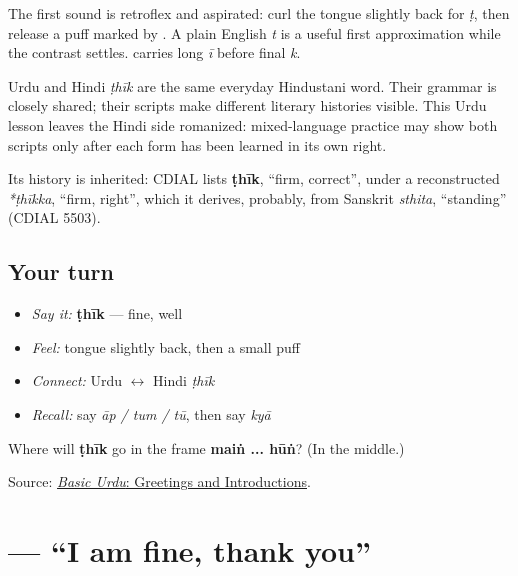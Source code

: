 The first sound is retroflex and aspirated: curl the tongue slightly back for \textbf{} \emph{ṭ}, then release a puff marked by \textbf{}. A plain English \emph{t} is a useful first approximation while the contrast settles. \textbf{} carries long \emph{ī} before final \textbf{} \emph{k}.

\begin{cousinweb}
Urdu \textbf{} and Hindi \emph{ṭhīk} are the same everyday Hindustani word. Their grammar is closely shared; their scripts make different literary histories visible. This Urdu lesson leaves the Hindi side romanized: mixed-language practice may show both scripts only after each form has been learned in its own right.

Its history is inherited: CDIAL lists \textbf{ṭhīk}, “firm, correct”, under a reconstructed \emph{*ṭhīkka}, “firm, right”, which it derives, probably, from Sanskrit \emph{sthita}, “standing” (CDIAL 5503).
\end{cousinweb}

\subsection*{Your turn}
\begin{itemize}
\raggedright
  \item \emph{Say it:} \textbf{ṭhīk} — fine, well
  \item \emph{Feel:} tongue slightly back, then a small puff
  \item \emph{Connect:} Urdu \textbf{} $\leftrightarrow$ Hindi \emph{ṭhīk}
  \item \emph{Recall:} say \emph{āp / tum / tū}, then say \emph{kyā}
\end{itemize}

\begin{tcolorbox}[breakable,colback=teal!4,colframe=teal!35!black,title={Before you move on}]
Where will \textbf{ṭhīk} go in the frame \textbf{maiṅ ... hūṅ}? (In the middle.)

Source: \href{https://openbooks.lib.msu.edu/urdu/chapter/2-2/}{\emph{Basic Urdu}: Greetings and Introductions}.
\end{tcolorbox}
\section[\texorpdfstring{\ur{میں} \ur{ٹھیک} \ur{ہوں،} … (maiṅ ṭhīk hūṅ …)}{میں ٹھیک ہوں، … (maiṅ ṭhīk hūṅ …)}]{    — “I am fine, thank you”}


